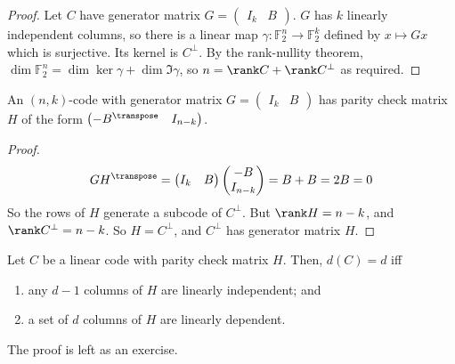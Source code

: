 \begin{proof}
    Let $C$ have generator matrix $G = \begin{pmatrix}
        I_k & B
    \end{pmatrix}$.
    $G$ has $k$ linearly independent columns, so there is a linear map $\gamma \colon \mathbb F_2^n \to \mathbb F_2^k$ defined by $x \mapsto Gx$ which is surjective.
    Its kernel is $C^\perp$.
    By the rank-nullity theorem, $\dim \mathbb F_2^n = \dim \ker \gamma + \dim \Im \gamma$, so $n = \rank C + \rank C^\perp$ as required.
\end{proof}

\begin{lemma}
    An $(n, k)$-code with generator matrix $G = \begin{pmatrix}
        I_k & B
    \end{pmatrix}$ has parity check matrix $H$ of the form $\begin{pmatrix}
        -B^\transpose & I_{n-k}
    \end{pmatrix}$.
\end{lemma}

\begin{proof}
    \begin{align*}
        GH^\transpose = \begin{pmatrix}
            I_k & B
        \end{pmatrix} \begin{pmatrix}
            -B \\
            I_{n-k}
        \end{pmatrix} = B + B = 2B = 0
    \end{align*}
    So the rows of $H$ generate a subcode of $C^\perp$.
    But $\rank H = n - k$, and $\rank C^\perp = n - k$.
    So $H = C^\perp$, and $C^\perp$ has generator matrix $H$.
\end{proof}

\begin{lemma}
    Let $C$ be a linear code with parity check matrix $H$.
    Then, $d(C) = d$ iff
    \begin{enumerate}
        \item any $d - 1$ columns of $H$ are linearly independent; and
        \item a set of $d$ columns of $H$ are linearly dependent.
    \end{enumerate}
\end{lemma}

The proof is left as an exercise.

